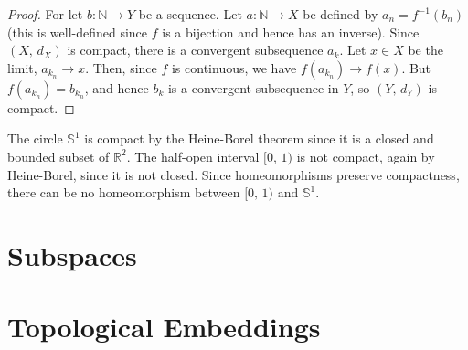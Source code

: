 \documentclass{article}
\theoremstyle{plain}
\theoremstyle{normal}
\begin{document}
        \begin{proof}
            For let $b:\mathbb{N}\rightarrow{Y}$ be a sequence. Let
            $a:\mathbb{N}\rightarrow{X}$ be defined by
            $a_{n}=f^{-1}(b_{n})$ (this is well-defined since $f$ is a bijection
            and hence has an inverse). Since $(X,\,d_{X})$ is compact, there
            is a convergent subsequence $a_{k}$. Let $x\in{X}$ be the limit,
            $a_{k_{n}}\rightarrow{x}$. Then, since $f$ is continuous, we have
            $f(a_{k_{n}})\rightarrow{f}(x)$. But $f(a_{k_{n}})=b_{k_{n}}$,
            and hence $b_{k}$ is a convergent subsequence in $Y$, so
            $(Y,\,d_{Y})$ is compact.
        \end{proof}
        The circle $\mathbb{S}^{1}$ is compact by the Heine-Borel theorem since
        it is a closed and bounded subset of $\mathbb{R}^{2}$. The half-open
        interval $[0,\,1)$ is not compact, again by Heine-Borel, since it is
        not closed. Since homeomorphisms preserve compactness, there can be
        no homeomorphism between $[0,\,1)$ and $\mathbb{S}^{1}$.
    \section{Subspaces}
    \section{Topological Embeddings}
\end{document}
